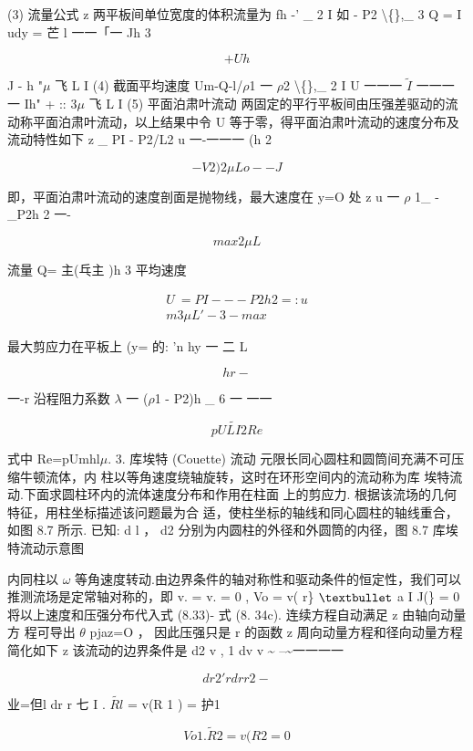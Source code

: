 (3) 流量公式 z 两平板间单位宽度的体积流量为 fh -' \_ 2 I 如 - P2 \textbackslash\{\},\_ 3 Q = I udy = 芒 l 一一「一 Jh 3

\[+Uh\]

J - h "$\mu$ 飞 L I (4) 截面平均速度 Um-Q-l/$\rho$1 一 $\rho$2 \textbackslash\{\},\_ 2 I U 一一一 $\tilde{I}$ 一一一一 Ih" + :: 3$\mu$ 飞 L I (5) 平面泊肃叶流动 两固定的平行平板间由压强差驱动的流动称平面泊肃叶流动，以上结果中令 U 等于零，得平面泊肃叶流动的速度分布及流动特性如下 z \_ PI - P2/L2 u 一-一一一 (h 2

\[- V2 ) 2\mu L o-- J\]

即，平面泊肃叶流动的速度剖面是抛物线，最大速度在 y=O 处 z u 一 $\rho$ 1\_ -\_P2h 2 一-

\[max 2\mu L\]

流量 Q= 主(乓主 )h 3 平均速度

\begin{gather*}
U~ = PI- -- P2h2 = : u\\
m 3\mu  L'- 3 -max
\end{gather*}

最大剪应力在平板上 (y= 的: 'n hy 一 二 L

\[hr-\]

一-r 沿程阻力系数 $\lambda$ 一 ($\rho$1 - P2)h \_ 6 一 一一

\begin{equation*}pU\tilde{LI}2 Re\tag{8.52}\end{equation*}

式中 Re=pUmhl$\mu$. 3. 库埃特 (Couette) 流动 元限长同心圆柱和圆筒间充满不可压缩牛顿流体，内 柱以等角速度绕轴旋转，这时在环形空间内的流动称为库 埃特流动.下面求圆柱环内的流体速度分布和作用在柱面 上的剪应力. 根据该流场的几何特征，用柱坐标描述该问题最为合 适，使柱坐标的轴线和同心圆柱的轴线重合，如图 8.7 所示. 已知: d l ， d2 分别为内圆柱的外径和外圆筒的内径，图 8.7 库埃特流动示意图

内同柱以 $\omega$ 等角速度转动.由边界条件的轴对称性和驱动条件的恒定性，我们可以 推测流场是定常轴对称的，即 v. = v. = 0 , Vo = v( r\} ${\rm •}$ a I J(\} = 0 将以上速度和压强分布代入式 (8.33)- 式 (8. 34c). 连续方程自动满足 z 由轴向动量方 程可导出 $\theta$ pjaz=O ， 因此压强只是 r 的函数 z 周向动量方程和径向动量方程简化如下 z 该流动的边界条件是 d2 v , 1 dv v \textasciitilde{} --\textasciitilde{}一一一一

\[dr2 ' r dr r 2 -\]

业=但l dr r 七 I . $\tilde{Rl}$ = v(R 1 ) = 护1

\[Vo 1. \tilde{R}2 = v(R 2  = 0\]


